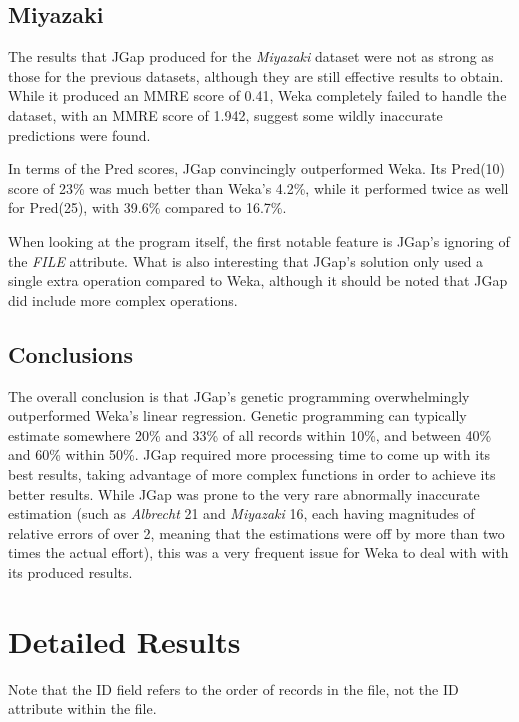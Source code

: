 \documentclass[11pt, a4paper]{article}
\begin{document}
\subsection{Miyazaki} %
\label{sub:miyazaki_comp}
The results that JGap produced for the \emph{Miyazaki} dataset were not as
strong as those for the previous datasets, although they are still effective
results to obtain. While it produced an MMRE score of 0.41, Weka completely
failed to handle the dataset, with an MMRE score of 1.942, suggest some wildly
inaccurate predictions were found.

In terms of the Pred scores, JGap convincingly outperformed Weka. Its Pred(10)
score of 23\% was much better than Weka's 4.2\%, while it performed twice as
well for Pred(25), with 39.6\% compared to 16.7\%.

When looking at the program itself, the first notable feature is JGap's ignoring
of the \emph{FILE} attribute. What is also interesting that JGap's solution only
used a single extra operation compared to Weka, although it should be noted that
JGap did include more complex operations.

\subsection{Conclusions} %
\label{sub:conclusions}
The overall conclusion is that JGap's genetic programming overwhelmingly
outperformed Weka's linear regression. Genetic programming can typically
estimate somewhere 20\% and 33\% of all records within 10\%, and between 40\%
and 60\% within 50\%. JGap required more processing time to come up with its
best results, taking advantage of more complex functions in order to achieve
its better results. While JGap was prone to the very rare abnormally inaccurate
estimation (such as \emph{Albrecht} 21 and \emph{Miyazaki} 16, each having
magnitudes of relative errors of over 2, meaning that the estimations were
off by more than two times the actual effort), this was a very frequent issue
for Weka to deal with with its produced results. 

\newpage
\appendix
\section{Detailed Results} %
\label{sec:detailed_results}
Note that the ID field refers to the order of records in the file, not the ID
attribute within the file.





 
\end{document}
